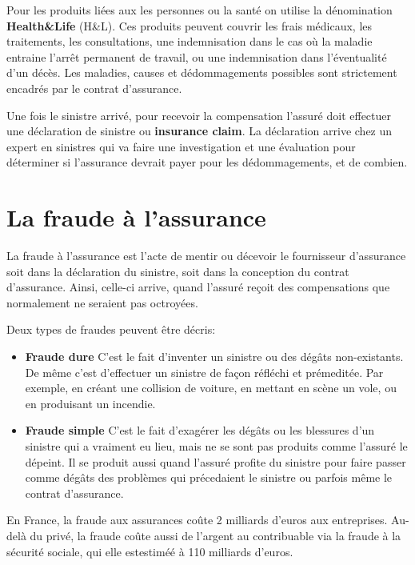 \documentclass [twoside,openright,a4paper,11pt,french] {report}
\begin{document}
Pour les produits liées aux les personnes ou la santé on utilise la dénomination
\textbf{Health\&Life} (H\&L). Ces produits peuvent couvrir les frais médicaux, les traitements, 
les consultations, une indemnisation dans le cas où la maladie entraine l'arrêt permanent de travail,
ou une indemnisation dans l'éventualité d'un décès. Les maladies, causes et dédommagements possibles sont 
strictement encadrés par le contrat d'assurance. 

Une fois le sinistre arrivé, pour recevoir la compensation l'assuré doit effectuer une déclaration
de sinistre ou \textbf{insurance claim}. La déclaration arrive chez un expert en sinistres qui va faire 
une investigation et une évaluation pour déterminer si l'assurance devrait payer pour les 
dédommagements, et de combien. 

\section{La fraude à l'assurance}

La fraude à l'assurance est l'acte de mentir ou décevoir le fournisseur d'assurance
soit dans la déclaration du sinistre, soit dans la conception du contrat d'assurance. 
Ainsi, celle-ci arrive, quand l'assuré reçoit des compensations que normalement 
ne seraient pas octroyées. 

Deux types de fraudes peuvent être décris:

\begin{itemize}
    \item \textbf{Fraude dure} C'est le fait d'inventer un sinistre ou des 
     dégâts non-existants. De même c'est d'effectuer un sinistre
     de façon réfléchi et prémeditée. Par exemple, en créant une collision de voiture,
    en mettant en scène un vole, ou en produisant un incendie. 

    \item \textbf{Fraude simple} C'est le fait d'exagérer les dégâts ou les 
    blessures d'un sinistre qui a vraiment eu lieu, mais ne se sont pas produits comme l'assuré 
    le dépeint. Il se produit aussi quand l'assuré profite du sinistre pour faire passer
    comme dégâts des problèmes qui précedaient le sinistre ou parfois même le contrat d'assurance. 

\end{itemize}

En France, la fraude aux assurances coûte 2 milliards d'euros aux entreprises. Au-delà du privé, 
la fraude coûte aussi de l'argent au contribuable via la fraude à la sécurité sociale, qui elle estestiméé 
à 110 milliards d'euros. 
\end{document}
